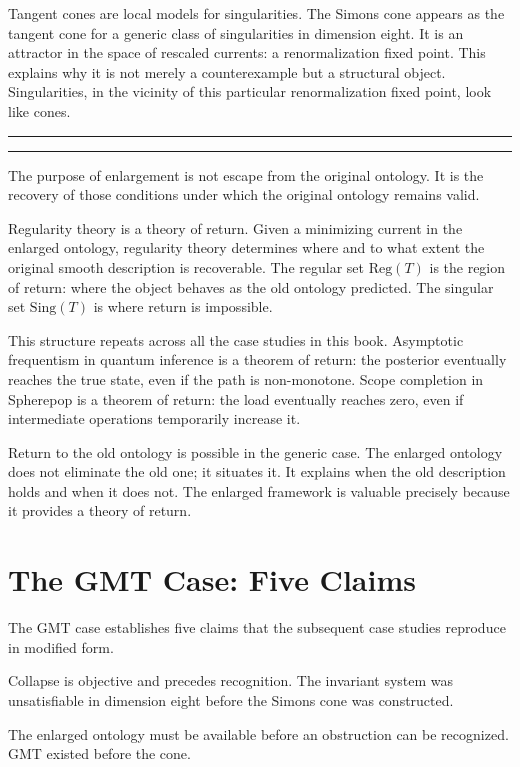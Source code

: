 \documentclass[12pt,oneside]{book}
\theoremstyle{plain}
\theoremstyle{definition}
\theoremstyle{remark}
\newenvironment{interlude}[1]{%
  \vspace{1.4em}
  \begin{center}
  \rule{0.38\textwidth}{0.4pt}\quad{\small\itshape #1}\quad\rule{0.38\textwidth}{0.4pt}
  \end{center}
  \vspace{0.4em}
  \small\itshape
}{%
  \normalsize\normalfont
  \vspace{1.4em}
}
\begin{document}
Tangent cones are local models for singularities. The Simons cone appears
as the tangent cone for a generic class of singularities in dimension eight.
It is an attractor in the space of rescaled currents: a renormalization fixed
point. This explains why it is not merely a counterexample but a structural
object. Singularities, in the vicinity of this particular renormalization
fixed point, look like cones.

\begin{interlude}{Return and Recovery}
The purpose of enlargement is not escape from the original ontology.
It is the recovery of those conditions under which the original ontology
remains valid.

Regularity theory is a theory of return. Given a minimizing current in the
enlarged ontology, regularity theory determines where and to what extent the
original smooth description is recoverable. The regular set $\mathrm{Reg}(T)$
is the region of return: where the object behaves as the old ontology
predicted. The singular set $\mathrm{Sing}(T)$ is where return is impossible.

This structure repeats across all the case studies in this book. Asymptotic
frequentism in quantum inference is a theorem of return: the posterior
eventually reaches the true state, even if the path is non-monotone.
Scope completion in Spherepop is a theorem of return: the load eventually
reaches zero, even if intermediate operations temporarily increase it.

Return to the old ontology is possible in the generic case. The enlarged
ontology does not eliminate the old one; it situates it. It explains when
the old description holds and when it does not. The enlarged framework is
valuable precisely because it provides a theory of return.
\end{interlude}

\section{The GMT Case: Five Claims}

The GMT case establishes five claims that the subsequent case studies
reproduce in modified form.

Collapse is objective and precedes recognition. The invariant system was
unsatisfiable in dimension eight before the Simons cone was constructed.

The enlarged ontology must be available before an obstruction can be
recognized. GMT existed before the cone.
\end{document}
